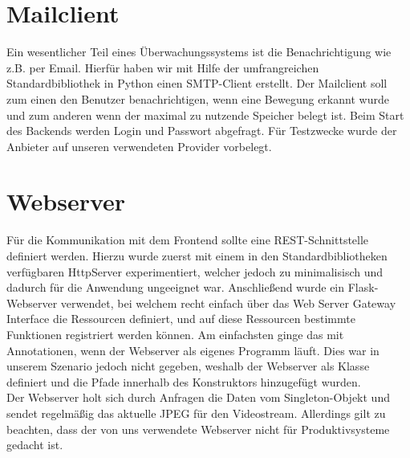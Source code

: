 \section{Mailclient}
Ein wesentlicher Teil eines Überwachungssystems ist die Benachrichtigung wie z.B. per Email.
Hierfür haben wir mit Hilfe der umfrangreichen Standardbibliothek in Python einen SMTP-Client erstellt.
Der Mailclient soll zum einen den Benutzer benachrichtigen, wenn eine Bewegung erkannt wurde und zum anderen wenn der maximal zu nutzende Speicher belegt ist.
Beim Start des Backends werden Login und Passwort abgefragt. Für Testzwecke wurde der Anbieter auf unseren verwendeten Provider vorbelegt.
\section{Webserver}
Für die Kommunikation mit dem Frontend sollte eine REST-Schnittstelle definiert werden. Hierzu wurde zuerst mit einem in den Standardbibliotheken verfügbaren HttpServer experimentiert,
welcher jedoch zu minimalisisch und dadurch für die Anwendung ungeeignet war. Anschließend wurde ein Flask-Webserver verwendet, bei welchem recht einfach über das Web Server Gateway Interface die Ressourcen definiert,
und auf diese Ressourcen bestimmte Funktionen registriert werden können. Am einfachsten ginge das mit Annotationen, wenn der Webserver als eigenes Programm läuft. Dies war in unserem Szenario jedoch nicht gegeben, weshalb der Webserver als Klasse definiert und die Pfade innerhalb des Konstruktors hinzugefügt wurden.\\
Der Webserver holt sich durch Anfragen die Daten vom Singleton-Objekt und sendet regelmäßig das aktuelle JPEG für den Videostream.
Allerdings gilt zu beachten, dass der von uns verwendete Webserver nicht für Produktivsysteme gedacht ist.